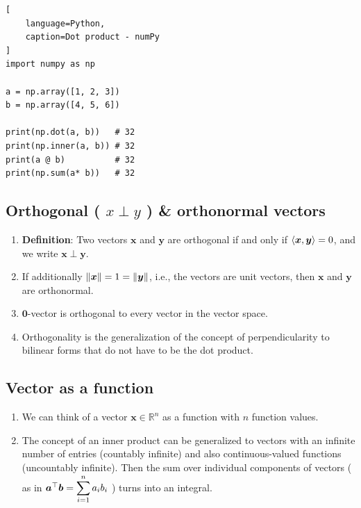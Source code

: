 \begin{lstlisting}[
    language=Python,
    caption=Dot product - numPy
]
import numpy as np

a = np.array([1, 2, 3])
b = np.array([4, 5, 6])

print(np.dot(a, b))   # 32
print(np.inner(a, b)) # 32
print(a @ b)          # 32
print(np.sum(a* b))   # 32
\end{lstlisting}











\subsection{Orthogonal ( $x \perp y$ ) \& orthonormal vectors}

\begin{enumerate}
    \item \textbf{Definition}: Two vectors $\bm{x}$ and $\bm{y}$ are orthogonal if and only if $\langle\bm{x}, \bm{y}\rangle = 0$, and we write $\bm{x} \perp \bm{y}$. 
    \hfill \cite{mfml/book/mml/Deisenroth-Faisal-Ong}
    
    \item If additionally $\left\| \bm{x} \right\| = 1 = \left\| \bm{y} \right\|$, i.e., the vectors are unit vectors, then $\bm{x}$ and $\bm{y}$ are orthonormal.
    \hfill \cite{mfml/book/mml/Deisenroth-Faisal-Ong}

    \item $\bm{0}$-vector is orthogonal to every vector in the vector space.
    \hfill \cite{mfml/book/mml/Deisenroth-Faisal-Ong}

    \item Orthogonality is the generalization of the concept of perpendicularity to bilinear forms that do not have to be the dot product.
    \hfill \cite{mfml/book/mml/Deisenroth-Faisal-Ong}
\end{enumerate}




\subsection{Vector as a function}


\begin{enumerate}
    \item We can think of a vector $\bm{x} \in \mathbb{R}^n$ as a function with $n$ function values.
    \hfill \cite{mfml/book/mml/Deisenroth-Faisal-Ong}

    \item The concept of an inner product can be generalized to vectors with an infinite number of entries (countably infinite) and also continuous-valued functions (uncountably infinite).
    Then the sum over individual components of vectors ( as in $\bm{a}^\top \bm{b} = \displaystyle\sum^n_{i=1} a_i b_i$ ) turns into an integral.
    \hfill \cite{mfml/book/mml/Deisenroth-Faisal-Ong}

    
\end{enumerate}




